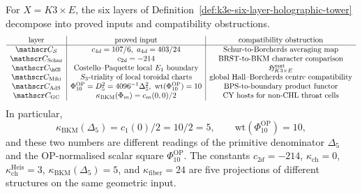 \begin{theorem}
\label{thm:k3e-six-layer-holographic-stratification}
For \(X=K3\times E\), the six layers of
Definition~\ref{def:k3e-six-layer-holographic-tower} decompose into
proved inputs and compatibility obstructions.
\[
\begin{array}{c|c|c}
\textup{layer} & \textup{proved input} & \textup{compatibility obstruction}\\
\hline
\mathscr C_{\mathcal S} &
c_{4d}=107/6,\ a_{4d}=403/24 &
\textup{Schur-to-Borcherds averaging map}\\
\mathscr C_{\mathrm{Schur}} &
c_{2d}=-214 &
\textup{BRST-to-BKM character comparison}\\
\mathscr C_{\hCS} &
\textup{Costello--Paquette local }E_1\textup{ boundary} &
\mathfrak H_{K3\times E}^{\mathrm{mat}}\\
\mathscr C_{\mathrm{Miki}} &
S_3\textup{-triality of local toroidal charts} &
\textup{global Hall--Borcherds centre compatibility}\\
\mathscr C_{\mathrm{AdS}} &
\Phi_{10}^{\mathrm{OP}}=D_5^2=4096^{-1}\Delta_5^2,\ \mathrm{wt}(\Phi_{10}^{\mathrm{OP}})=10 &
\textup{BPS-to-boundary product functor}\\
\mathscr C_{\mathrm{GC}} &
\kappa_{\mathrm{BKM}}(\Phi_m)=c_m(0,0)/2 &
\textup{CY hosts for non-CHL throat cells}
\end{array}
\]
In particular,
\[
 \kappa_{\mathrm{BKM}}(\Delta_5)
 = c_1(0)/2 = 10/2 = 5,\qquad
 \mathrm{wt}(\Phi_{10}^{\mathrm{OP}})=10,
\]
and these two numbers are different readings of the primitive
denominator \(\Delta_5\) and the OP-normalised scalar square
\(\Phi_{10}^{\mathrm{OP}}\). The constants
\(c_{2d}=-214\), \(\kappa_{\mathrm{ch}}=0\),
\(\kappa_{\mathrm{ch}}^{\mathrm{Heis}}=3\),
\(\kappa_{\mathrm{BKM}}(\Delta_5)=5\), and
\(\kappa_{\mathrm{fiber}}=24\) are five projections of different
structures on the same geometric input.
\end{theorem}

